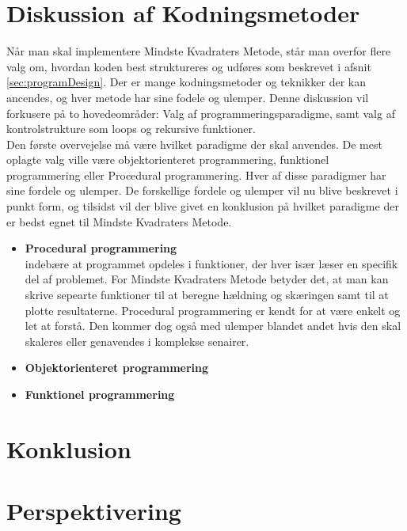 \section{Diskussion af Kodningsmetoder}\label{sec:Kodningsmetoder}
Når man skal implementere Mindste Kvadraters Metode, står man overfor flere valg om, hvordan koden best struktureres og udføres som beskrevet i afsnit \ref{sec:programDesign}. Der er mange kodningsmetoder og teknikker der kan ancendes, og hver metode har sine fodele og ulemper. Denne diskussion vil forkusere på to hovedeområder: Valg af programmeringsparadigme, samt valg af kontrolstrukture som loops og rekursive funktioner. \\
Den første overvejelse må være hvilket paradigme der skal anvendes. De mest oplagte valg ville være objektorienteret programmering, funktionel programmering eller Procedural programmering. Hver af disse paradigmer har sine fordele og ulemper. De forskellige fordele og ulemper vil nu blive beskrevet i punkt form, og tilsidst vil der blive givet en konklusion på hvilket paradigme der er bedst egnet til Mindste Kvadraters Metode. 
\begin{itemize}
    \item \textbf{Procedural programmering} \\
    indebære at programmet opdeles i funktioner, der hver især læser en specifik del af problemet. For Mindste Kvadraters Metode betyder det, at man kan skrive sepearte funktioner til at beregne hældning og skæringen samt til at plotte resultaterne. Procedural programmering er kendt for at være enkelt og let at forstå. Den kommer dog også med ulemper blandet andet hvis den skal skaleres eller genavendes i komplekse senairer. 
    \item \textbf{Objektorienteret programmering} \\

    
    \item \textbf{Funktionel programmering} \\
    

\end{itemize}


\section{Konklusion}

\section{Perspektivering}
